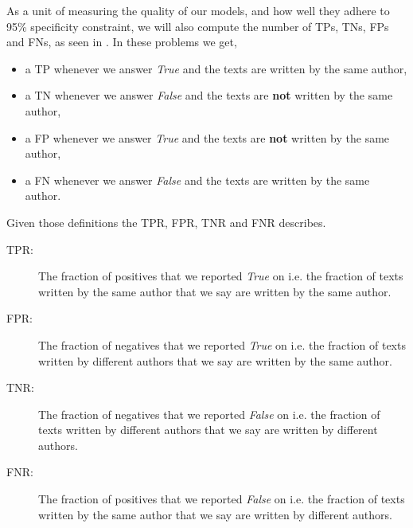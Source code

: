 As a unit of measuring the quality of our models, and how well they adhere to
95\% specificity constraint, we will also compute the number of \gls{TP}s,
\gls{TN}s, \gls{FP}s and \gls{FN}s, as seen in \citet{US}. In these problems we
get,

\begin{itemize}
    \item a \gls{TP} whenever we answer \textit{True} and the texts are written
        by the same author,
    \item a \gls{TN} whenever we answer \textit{False} and the texts are
        \textbf{not} written by the same author,
    \item a \gls{FP} whenever we answer \textit{True} and the texts are
        \textbf{not} written by the same author,
    \item a \gls{FN} whenever we answer \textit{False} and the texts are written
        by the same author.
\end{itemize}

Given those definitions the \gls{TPR}, \gls{FPR}, \gls{TNR} and \gls{FNR}
describes.

\begin{description}
    \item[\gls{TPR}: ]

        The fraction of positives that we reported \textit{True} on i.e. the
        fraction of texts written by the same author that we say are written by
        the same author.

    \item[\gls{FPR}: ]

        The fraction of negatives that we reported \textit{True} on i.e. the
        fraction of texts written by different authors that we say are written
        by the same author.

    \item[\gls{TNR}: ]

        The fraction of negatives that we reported \textit{False} on i.e. the
        fraction of texts written by different authors that we say are written
        by different authors.

    \item[\gls{FNR}: ]

        The fraction of positives that we reported \textit{False} on i.e. the
        fraction of texts written by the same author that we say are written by
        different authors.

\end{description}


